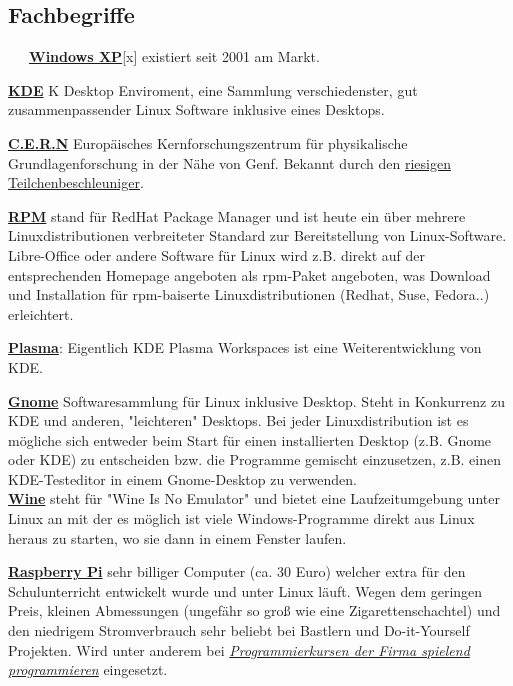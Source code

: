 \documentclass[10pt,a4paper,ngerman,twoside]{article} %
\begin{document}
\subsection*{Fachbegriffe}
~~~\href{http://de.wikipedia.org/wiki/Windows_XP}{\textbf{Windows XP}}[x] existiert seit 2001 am Markt. 

\href{http://de.wikipedia.org/wiki/Kde}{\textbf{KDE}} K Desktop Enviroment, eine Sammlung verschiedenster, gut zusammenpassender Linux Software inklusive eines Desktops. 

\href{http://de.wikipedia.org/wiki/Cern}{\textbf{C.E.R.N}} Europäisches Kernforschungszentrum für physikalische Grundlagenforschung in der Nähe von Genf. Bekannt durch den \href{http://de.wikipedia.org/wiki/Large_Hadron_Collider}{riesigen Teilchenbeschleuniger}. 

\href{http://de.wikipedia.org/wiki/RPM_Package_Manager}{\textbf{RPM}} stand für RedHat Package Manager und ist heute ein über mehrere Linuxdistributionen verbreiteter Standard zur Bereitstellung von Linux-Software. Libre-Office oder andere Software für Linux wird z.B. direkt auf der entsprechenden Homepage angeboten als rpm-Paket angeboten, was Download und Installation für rpm-baiserte Linuxdistributionen (Redhat, Suse, Fedora..) erleichtert. 

\href{http://de.wikipedia.org/wiki/KDE_Plasma_Workspaces}{\textbf{Plasma}}: Eigentlich KDE Plasma Workspaces ist eine Weiterentwicklung von KDE. 

\href{http://de.wikipedia.org/wiki/Gnome}{\textbf{Gnome}} Softwaresammlung für Linux inklusive Desktop. Steht in Konkurrenz zu KDE und anderen, "leichteren" Desktops. Bei jeder Linuxdistribution ist es mögliche sich entweder beim Start für einen installierten Desktop (z.B. Gnome oder KDE) zu entscheiden bzw. die Programme gemischt einzusetzen, z.B. einen KDE-Testeditor in einem Gnome-Desktop zu verwenden. \\
\href{http://de.wikipedia.org/wiki/Wine}{\textbf{Wine}} steht für "Wine Is No Emulator" und bietet eine Laufzeitumgebung unter Linux an mit der es möglich ist viele Windows-Programme direkt aus Linux heraus zu starten, wo sie dann in einem Fenster laufen. 

\href{http://de.wikipedia.org/wiki/Raspberry_Pi}{\textbf{Raspberry Pi}} sehr billiger Computer (ca. 30 Euro) welcher extra für den Schulunterricht entwickelt wurde und unter Linux läuft. Wegen dem geringen Preis, kleinen Abmessungen (ungefähr so groß wie eine Zigarettenschachtel) und den niedrigem Stromverbrauch sehr beliebt bei Bastlern und Do-it-Yourself Projekten. Wird unter anderem bei \href{http://spielend-programmieren.at}{\textit{Programmierkursen der Firma spielend programmieren}} eingesetzt. 
\end{document}
